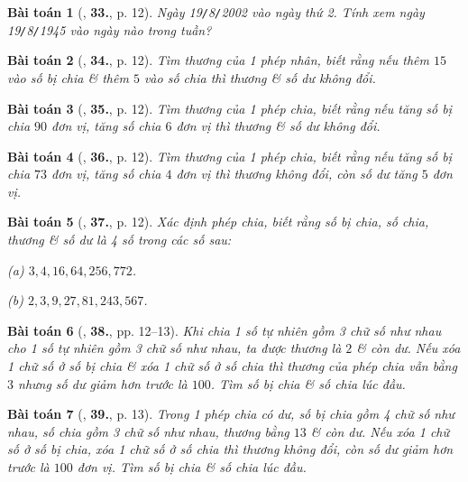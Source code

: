 \documentclass{article}
\numberwithin{equation}{section}
\newtheorem{baitoan}{Bài toán}[section]
\begin{document}
\begin{baitoan}[\cite{Binh_Toan_6_tap_1}, \textbf{33.}, p. 12]
	Ngày 19\emph{\texttt{/}}8\emph{\texttt{/}}2002 vào ngày thứ 2. Tính xem ngày 19\emph{\texttt{/}}8\emph{\texttt{/}}1945 vào ngày nào trong tuần?
\end{baitoan}

\begin{baitoan}[\cite{Binh_Toan_6_tap_1}, \textbf{34.}, p. 12]
	Tìm thương của 1 phép nhân, biết rằng nếu thêm $15$ vào số bị chia \& thêm $5$ vào số chia thì thương \& số dư không đổi.
\end{baitoan}

\begin{baitoan}[\cite{Binh_Toan_6_tap_1}, \textbf{35.}, p. 12]
	Tìm thương của 1 phép chia, biết rằng nếu tăng số bị chia $90$ đơn vị, tăng số chia $6$ đơn vị thì thương \& số dư không đổi.
\end{baitoan}

\begin{baitoan}[\cite{Binh_Toan_6_tap_1}, \textbf{36.}, p. 12]
	Tìm thương của 1 phép chia, biết rằng nếu tăng số bị chia $73$ đơn vị, tăng số chia $4$ đơn vị thì thương không đổi, còn số dư tăng $5$ đơn vị.
\end{baitoan}

\begin{baitoan}[\cite{Binh_Toan_6_tap_1}, \textbf{37.}, p. 12]
	Xác định phép chia, biết rằng số bị chia, số chia, thương \& số dư là 4 số trong các số sau:
	\begin{enumerate*}
		\item[(a)] $3,4,16,64,256,772$.
		\item[(b)] $2,3,9,27,81,243,567$.
	\end{enumerate*}
\end{baitoan}

\begin{baitoan}[\cite{Binh_Toan_6_tap_1}, \textbf{38.}, pp. 12--13]
	Khi chia 1 số tự nhiên gồm 3 chữ số như nhau cho 1 số tự nhiên gồm 3 chữ số như nhau, ta được thương là $2$ \& còn dư. Nếu xóa 1 chữ số ở số bị chia \& xóa 1 chữ số ở số chia thì thương của phép chia vẫn bằng $3$ nhưng số dư giảm hơn trước là $100$. Tìm số bị chia \& số chia lúc đầu.
\end{baitoan}

\begin{baitoan}[\cite{Binh_Toan_6_tap_1}, \textbf{39.}, p. 13]
	Trong 1 phép chia có dư, số bị chia gồm 4 chữ số như nhau, số chia gồm 3 chữ số như nhau, thương bằng $13$ \& còn dư. Nếu xóa 1 chữ số ở số bị chia, xóa 1 chữ số ở số chia thì thương không đổi, còn số dư giảm hơn trước là $100$ đơn vị. Tìm số bị chia \& số chia lúc đầu.
\end{baitoan}
\end{document}
